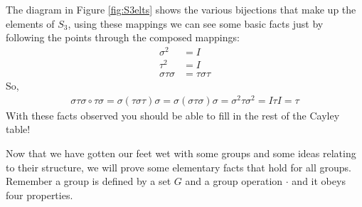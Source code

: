\noindent The diagram in Figure \ref{fig:S3elts} shows the various bijections that make up the
elements of $S_3$, using these mappings we can see some basic facts just by following the points
through the composed mappings:
\begin{align}
    \sigma^2&= I \nonumber \\
    \tau^2&=I \nonumber \\
    \sigma\tau\sigma&=\tau\sigma\tau \nonumber
\end{align}
So,
\begin{align}
    \sigma\tau\sigma \circ \tau\sigma = \sigma(\tau\sigma\tau)\sigma= \sigma(\sigma\tau\sigma)\sigma=\sigma^2\tau\sigma^2=I\tau I=\tau \nonumber
\end{align}
With these facts observed you should be able to fill in the rest of the Cayley table!\steezybreak

\noindent Now that we have gotten our feet wet with some groups and some ideas relating to their
structure, we will prove some elementary facts that hold for all groups. Remember a group is defined
by a set $G$ and a group operation $\cdot$ and it obeys four properties.\vspace{-0.5cm}
